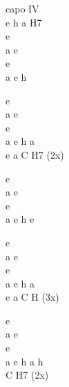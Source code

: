 \begin{chord}
\ifOneCol \else \footnotesize{ \fi
\vin capo IV\\
\OneColVin e h a H7\\
e\\ \ifOneCol \else \hfill\break \fi
a e\\
e\\
a e h

\OneColVin e\\
\OneColVin a e\\
\OneColVin e\\
\OneColVin a e h a\\
e a C H7 (2x)

e\\
a e\\
e\\
a e h e

\OneColVin e\\
\OneColVin a e\\
\OneColVin e\\
\OneColVin a e h a\\
e a C H (3x)

\OneColVin e\\
\OneColVin a e\\
\OneColVin e\\
\OneColVin a e h a h \\
C H7 (2x)
\ifOneCol \else } \fi
\end{chord}
